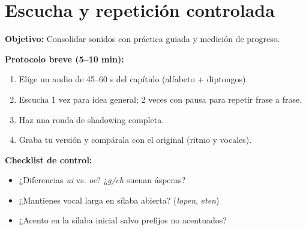 \section{Escucha y repetición controlada}
\textbf{Objetivo:} Consolidar sonidos con práctica guiada y medición de progreso.

\textbf{Protocolo breve (5--10 min):}
\begin{enumerate}[leftmargin=*]
  \item Elige un audio de 45--60 s del capítulo (alfabeto + diptongos).
  \item Escucha 1 vez para idea general; 2 veces con pausa para repetir frase a frase.
  \item Haz una ronda de shadowing completa.
  \item Graba tu versión y compárala con el original (ritmo y vocales).
\end{enumerate}

\textbf{Checklist de control:}
\begin{itemize}[leftmargin=*]
  \item ¿Diferencias \textit{ui} vs. \textit{oe}? ¿\textit{g/ch} suenan ásperas?\ 
  \item ¿Mantienes vocal larga en sílaba abierta? (\textit{lopen}, \textit{eten})
  \item ¿Acento en la sílaba inicial salvo prefijos no acentuados?
\end{itemize}
